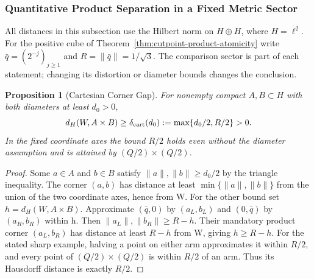 \documentclass[11pt,a4paper]{article}
\theoremstyle{plain}
\newtheorem{proposition}[theorem]{Proposition}
\theoremstyle{definition}
\theoremstyle{remark}
\begin{document}
\subsubsection{Quantitative Product Separation in a Fixed Metric Sector}

All distances in this subsection use the Hilbert norm on $H\oplus H$, where
$H=\ell^2$. For the positive cube of Theorem~\ref{thm:cutpoint-product-atomicity}
write $\bar q=(2^{-j})_{j\ge1}$ and $R=\|\bar q\|=1/\sqrt3$.
The comparison sector is part of each statement; changing its distortion or
diameter bounds changes the conclusion.

\begin{proposition}[Cartesian Corner Gap]\label{prop:wedge-cartesian-gap}
For nonempty compact $A,B\subset H$ with both diameters at least $d_0>0$,
\[
 d_H(W,A\times B)\ge
 \delta_{\rm cart}(d_0):=\max\{d_0/2,R/2\}>0.
\]
In the fixed coordinate axes the bound $R/2$ holds even without the diameter
assumption and is attained by $(Q/2)\times(Q/2)$.
\end{proposition}
\begin{proof}
Some $a\in A$ and $b\in B$ satisfy $\|a\|,\|b\|\ge d_0/2$ by the triangle
inequality. The corner $(a,b)$ has distance at least
$\min\{\|a\|,\|b\|\}$ from the union of the two coordinate axes, hence from W.
For the other bound set $h=d_H(W,A\times B)$. Approximate $(\bar q,0)$ by
$(a_L,b_L)$ and $(0,\bar q)$ by $(a_R,b_R)$ within h. Then
$\|a_L\|,\|b_R\|\ge R-h$. Their mandatory product corner $(a_L,b_R)$ has
distance at least $R-h$ from W, giving $h\ge R-h$. For the stated sharp example,
halving a point on either arm approximates it within $R/2$, and every point
of $(Q/2)\times(Q/2)$ is within $R/2$ of an arm. Thus its Hausdorff distance is
exactly $R/2$.
\end{proof}
\end{document}

